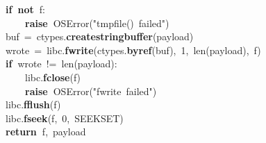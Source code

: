 \documentclass{article}\usepackage[]{graphicx}\usepackage[dvipsnames,table]{xcolor}
\makeatletter
\newcommand{\hlnum}[1]{\textcolor[rgb]{0.686,0.059,0.569}{#1}}%
\newcommand{\hlsng}[1]{\textcolor[rgb]{0.192,0.494,0.8}{#1}}%
\newcommand{\hlopt}[1]{\textcolor[rgb]{0,0,0}{#1}}%
\newcommand{\hldef}[1]{\textcolor[rgb]{0.345,0.345,0.345}{#1}}%
\newcommand{\hlkwa}[1]{\textcolor[rgb]{0.161,0.373,0.58}{\textbf{#1}}}%
\newcommand{\hlkwb}[1]{\textcolor[rgb]{0.69,0.353,0.396}{#1}}%
\newcommand{\hlkwc}[1]{\textcolor[rgb]{0.333,0.667,0.333}{#1}}%
\newcommand{\hlkwd}[1]{\textcolor[rgb]{0.737,0.353,0.396}{\textbf{#1}}}%
\newenvironment{kframe}{%
 \def\at@end@of@kframe{}%
 \ifinner\ifhmode%
  \def\at@end@of@kframe{\end{minipage}}%
  \begin{minipage}{\columnwidth}%
 \fi\fi%
 \def\FrameCommand##1{\hskip\@totalleftmargin \hskip-\fboxsep
 \colorbox{shadecolor}{##1}\hskip-\fboxsep
     \hskip-\linewidth \hskip-\@totalleftmargin \hskip\columnwidth}%
 \MakeFramed {\advance\hsize-\width
   \@totalleftmargin\z@ \linewidth\hsize
   \@setminipage}}%
 {\par\unskip\endMakeFramed%
 \at@end@of@kframe}
\newenvironment{knitrout}{}{} %
\makeatother
\begin{document}
\begin{center}
\begin{minipage}[m]{18cm}
\begin{knitrout}
\begin{kframe}
\hldef{}\hldef{\ \ \ \ }\hldef{}\hlkwa{if\ not\ }\hldef{f}\hlopt{:}\hspace*{\fill}\\
\hldef{}\hldef{\ \ \ \ \ \ \ \ }\hldef{}\hlkwa{raise\ }\hldef{}\hlkwc{OSError}\hldef{}\hlopt{(}\hldef{}\hlsng{"tmpfile()\ failed"}\hldef{}\hlopt{)}\hspace*{\fill}\\
\hldef{}\hldef{\ \ \ \ }\hldef{buf\ }\hlopt{=\ }\hldef{ctypes}\hlopt{.}\hldef{}\hlkwd{create\textunderscore string\textunderscore buffer}\hldef{}\hlopt{(}\hldef{payload}\hlopt{)}\hspace*{\fill}\\
\hldef{}\hldef{\ \ \ \ }\hldef{wrote\ }\hlopt{=\ }\hldef{\textunderscore libc}\hlopt{.}\hldef{}\hlkwd{fwrite}\hldef{}\hlopt{(}\hldef{ctypes}\hlopt{.}\hldef{}\hlkwd{byref}\hldef{}\hlopt{(}\hldef{buf}\hlopt{),\ }\hldef{}\hlnum{1}\hldef{}\hlopt{,\ }\hldef{}\hlkwb{len}\hldef{}\hlopt{(}\hldef{payload}\hlopt{),\ }\hldef{f}\hlopt{)}\hspace*{\fill}\\
\hldef{}\hldef{\ \ \ \ }\hldef{}\hlkwa{if\ }\hldef{wrote\ }\hlopt{!=\ }\hldef{}\hlkwb{len}\hldef{}\hlopt{(}\hldef{payload}\hlopt{):}\hspace*{\fill}\\
\hldef{}\hldef{\ \ \ \ \ \ \ \ }\hldef{\textunderscore libc}\hlopt{.}\hldef{}\hlkwd{fclose}\hldef{}\hlopt{(}\hldef{f}\hlopt{)}\hspace*{\fill}\\
\hldef{}\hldef{\ \ \ \ \ \ \ \ }\hldef{}\hlkwa{raise\ }\hldef{}\hlkwc{OSError}\hldef{}\hlopt{(}\hldef{}\hlsng{"fwrite\ failed"}\hldef{}\hlopt{)}\hspace*{\fill}\\
\hldef{}\hldef{\ \ \ \ }\hldef{\textunderscore libc}\hlopt{.}\hldef{}\hlkwd{fflush}\hldef{}\hlopt{(}\hldef{f}\hlopt{)}\hspace*{\fill}\\
\hldef{}\hldef{\ \ \ \ }\hldef{\textunderscore libc}\hlopt{.}\hldef{}\hlkwd{fseek}\hldef{}\hlopt{(}\hldef{f}\hlopt{,\ }\hldef{}\hlnum{0}\hldef{}\hlopt{,\ }\hldef{\textunderscore SEEK\textunderscore SET}\hlopt{)}\hspace*{\fill}\\
\hldef{}\hldef{\ \ \ \ }\hldef{}\hlkwa{return\ }\hldef{f}\hlopt{,\ }\hldef{payload}\hldef{\ \ }\hldef{}\hldef{}\hspace*{\fill}
\mbox{}
\normalfont
\end{kframe}
\end{knitrout}
\end{minipage}
\end{center}
\end{document}
